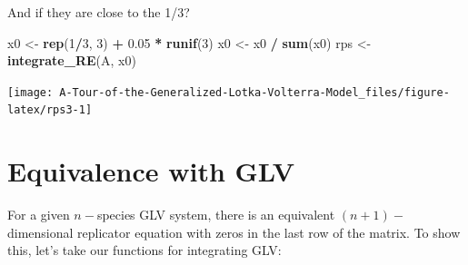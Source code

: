 \documentclass[]{book}
\newenvironment{Shaded}{\begin{snugshade}}{\end{snugshade}}
\newcommand{\DecValTok}[1]{\textcolor[rgb]{0.00,0.00,0.81}{#1}}
\newcommand{\FloatTok}[1]{\textcolor[rgb]{0.00,0.00,0.81}{#1}}
\newcommand{\KeywordTok}[1]{\textcolor[rgb]{0.13,0.29,0.53}{\textbf{#1}}}
\newcommand{\NormalTok}[1]{#1}
\newcommand{\OperatorTok}[1]{\textcolor[rgb]{0.81,0.36,0.00}{\textbf{#1}}}
\newcommand{\StringTok}[1]{\textcolor[rgb]{0.31,0.60,0.02}{#1}}
\begin{document}
And if they are close to the 1/3?

\begin{Shaded}
\begin{Highlighting}[]
\NormalTok{x0 <-}\StringTok{ }\KeywordTok{rep}\NormalTok{(}\DecValTok{1}\OperatorTok{/}\DecValTok{3}\NormalTok{, }\DecValTok{3}\NormalTok{) }\OperatorTok{+}\StringTok{ }\FloatTok{0.05} \OperatorTok{*}\StringTok{ }\KeywordTok{runif}\NormalTok{(}\DecValTok{3}\NormalTok{)}
\NormalTok{x0 <-}\StringTok{ }\NormalTok{x0 }\OperatorTok{/}\StringTok{ }\KeywordTok{sum}\NormalTok{(x0)}
\NormalTok{rps <-}\StringTok{ }\KeywordTok{integrate_RE}\NormalTok{(A, x0)}
\end{Highlighting}
\end{Shaded}

\begin{center}\texttt{[image: A-Tour-of-the-Generalized-Lotka-Volterra-Model\_files/figure-latex/rps3-1]} \end{center}

\hypertarget{equivalence-with-glv}{%
\section{Equivalence with GLV}\label{equivalence-with-glv}}

For a given \(n-\)species GLV system, there is an equivalent \((n+1)-\)dimensional replicator equation with zeros in the last row of the matrix. To show this, let's take our functions for integrating GLV:
\end{document}
